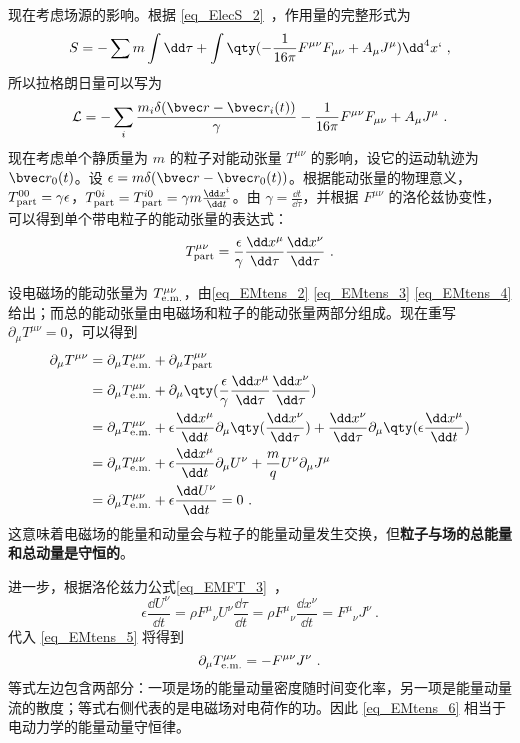 现在考虑场源的影响。根据 \autoref{eq_ElecS_2}~，作用量的完整形式为
\begin{equation}
S=-\sum{m\int \dd \tau}+\int \qty(-\frac{1}{16\pi}F^{\mu\nu}F_{\mu\nu}+A_\mu J^\mu ){\dd}^4 x`~,
\end{equation}
所以拉格朗日量可以写为
\begin{equation}
\mathcal{L}=-\sum_i \frac{m_i\delta(\bvec r-\bvec r_i(t))}{\gamma}-\frac{1}{16\pi}F^{\mu\nu}F_{\mu\nu}+A_\mu J^\mu~.
\end{equation}
现在考虑单个静质量为 $m$ 的粒子对能动张量 $T^{\mu\nu}$ 的影响，设它的运动轨迹为 $\bvec r_0(t)$。设 $\epsilon=m\delta(\bvec r-\bvec r_0(t))$。根据能动张量的物理意义，$T_{\rm{part}}^{00}=\gamma \epsilon$，$T_{\rm{part}}^{0i}=T_{\rm{part}}^{i0}=\gamma m \frac{\dd x^i}{\dd t}$。由 $\gamma=\frac{\dd t}{\dd \tau}$，并根据 $F^{\mu\nu}$ 的洛伦兹协变性，可以得到单个带电粒子的能动张量的表达式：
\begin{equation}
T_{\rm{part}}^{\mu\nu}=\frac{\epsilon}{\gamma}\frac{\dd x^\mu}{\dd \tau}\frac{\dd x^\nu}{\dd \tau}~.
\end{equation}

设电磁场的能动张量为 $T_{\rm{e.m.}}^{\mu\nu}$，由\autoref{eq_EMtens_2} \autoref{eq_EMtens_3} \autoref{eq_EMtens_4} 给出；而总的能动张量由电磁场和粒子的能动张量两部分组成。现在重写 $\partial_\mu T^{\mu\nu}=0$，可以得到
\begin{equation}\label{eq_EMtens_5}
\begin{aligned}
\partial_{\mu}T^{\mu\nu}&=\partial_\mu T_{\rm{e.m.}}^{\mu\nu}+\partial_\mu T_{\rm{part}}^{\mu\nu}\\
&=\partial_\mu T_{\rm{e.m.}}^{\mu\nu}+\partial_\mu\qty(\frac{\epsilon}{\gamma}\frac{\dd x^\mu}{\dd \tau}\frac{\dd x^\nu}{\dd \tau})\\
&=\partial_\mu T_{\rm{e.m.}}^{\mu\nu}+\epsilon \frac{\dd x^\mu}{\dd t}\partial_\mu\qty(\frac{\dd x^\nu}{\dd \tau})+\frac{\dd x^\nu}{\dd \tau}\partial_\mu\qty(\epsilon \frac{\dd x^\mu}{\dd t})\\
&=\partial_\mu T_{\rm{e.m.}}^{\mu\nu}+\epsilon \frac{\dd x^\mu}{\dd t}\partial_\mu U^\nu+\frac{m}{q}U^\nu\partial_\mu J^\mu \\
&=\partial_\mu T_{\rm{e.m.}}^{\mu\nu}+\epsilon \frac{\dd U^\nu}{\dd t}=0~.
\end{aligned}
\end{equation}
这意味着电磁场的能量和动量会与粒子的能量动量发生交换，但\textbf{粒子与场的总能量和总动量是守恒的}。

进一步，根据洛伦兹力公式\autoref{eq_EMFT_3}~，
\begin{equation}
\epsilon \frac{\dd U^\nu}{\dd t}=\rho F^\mu{}_\nu U^\nu \frac{\dd \tau}{\dd t}=\rho F^\mu{}_\nu\frac{\dd x^\nu}{\dd t}=F^\mu{}_\nu J^\nu ~.
\end{equation}
代入 \autoref{eq_EMtens_5} 将得到
\begin{equation}\label{eq_EMtens_6}
\partial_\mu T_{\rm{e.m.}}^{\mu\nu}=-F^{\mu\nu}J^\nu~.
\end{equation}
等式左边包含两部分：一项是场的能量动量密度随时间变化率，另一项是能量动量流的散度；等式右侧代表的是电磁场对电荷作的功。因此 \autoref{eq_EMtens_6} 相当于电动力学的能量动量守恒律。
